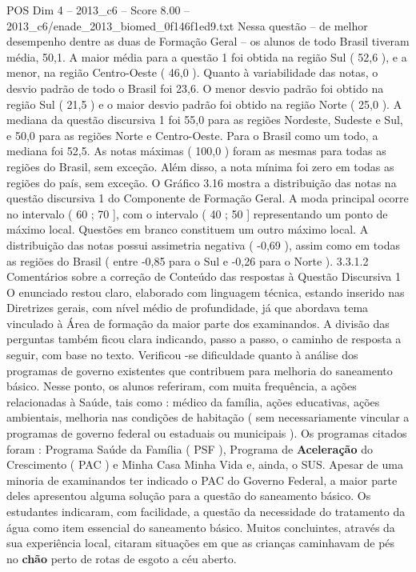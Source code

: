 \begin{textsample}{POS Dim 4 – 2013\_c6 – Score 8.00 – 2013\_c6/enade\_2013\_biomed\_0f146f1ed9.txt}
Nessa questão – de melhor desempenho dentre as duas de Formação Geral – os alunos de todo Brasil tiveram média, 50,1.
A maior média para a questão 1 foi obtida na região Sul ( 52,6 ), e a menor, na região Centro-Oeste ( 46,0 ).
Quanto à variabilidade das notas, o desvio padrão de todo o Brasil foi 23,6.
O menor desvio padrão foi obtido na região Sul ( 21,5 ) e o maior desvio padrão foi obtido na região Norte ( 25,0 ).
A mediana da questão discursiva 1 foi 55,0 para as regiões Nordeste, Sudeste e Sul, e 50,0 para as regiões Norte e Centro-Oeste.
Para o Brasil como um todo, a mediana foi 52,5.
As notas máximas ( 100,0 ) foram as mesmas para todas as regiões do Brasil, sem exceção.
Além disso, a nota mínima foi zero em todas as regiões do país, sem exceção.
O Gráfico 3.16 mostra a distribuição das notas na questão discursiva 1 do Componente de Formação Geral.
A moda principal ocorre no intervalo ( 60 ; 70 ], com o intervalo ( 40 ; 50 ] representando um ponto de máximo local.
Questões em branco constituem um outro máximo local.
A distribuição das notas possui assimetria negativa ( -0,69 ), assim como em todas as regiões do Brasil ( entre -0,85 para o Sul e -0,26 para o Norte ). 3.3.1.2 Comentários sobre a correção de Conteúdo das respostas à Questão Discursiva 1 O enunciado restou claro, elaborado com linguagem técnica, estando inserido nas Diretrizes gerais, com nível médio de profundidade, já que abordava tema vinculado à Área de formação da maior parte dos examinandos.
A divisão das perguntas também ficou clara indicando, passo a passo, o caminho de resposta a seguir, com base no texto.
Verificou -se dificuldade quanto à análise dos programas de governo existentes que contribuem para melhoria do saneamento básico.
Nesse ponto, os alunos referiram, com muita frequência, a ações relacionadas à Saúde, tais como : médico da família, ações educativas, ações ambientais, melhoria nas condições de habitação ( sem necessariamente vincular a programas de governo federal ou estaduais ou municipais ).
Os programas citados foram : Programa Saúde da Família ( PSF ), Programa de \textbf{Aceleração} do Crescimento ( PAC ) e Minha Casa Minha Vida e, ainda, o SUS.
Apesar de uma minoria de examinandos ter indicado o PAC do Governo Federal, a maior parte deles apresentou alguma solução para a questão do saneamento básico.
Os estudantes indicaram, com facilidade, a questão da necessidade do tratamento da água como item essencial do saneamento básico.
Muitos concluintes, através da sua experiência local, citaram situações em que as crianças caminhavam de pés no \textbf{chão} perto de rotas de esgoto a céu aberto.

\end{textsample}
